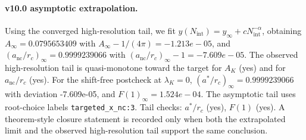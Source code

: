 \paragraph{v10.0 asymptotic extrapolation.}
Using the converged high-resolution tail, we fit $y(N_{\mathrm{int}})=y_{\infty}+cN_{\mathrm{int}}^{-\alpha}$, obtaining $A_\infty=0.0795653409$ with $A_\infty-1/(4\pi)=-1.213e-05$, and $(a_{\mathrm{nc}}/r_c)_\infty=0.9999239066$ with $(a_{\mathrm{nc}}/r_c)_\infty-1=-7.609e-05$. The observed high-resolution tail is quasi-monotone toward the target for $A_K$ (yes) and for $a_{\mathrm{nc}}/r_c$ (yes). For the shift-free postcheck at $\lambda_K=0$, $(a^*/r_c)_\infty=0.9999239066$ with deviation -7.609e-05, and $F(1)_\infty=1.524e-04$. The asymptotic tail uses root-choice labels \texttt{targeted_x_nc:3}. Tail checks: $a^*/r_c$ (yes), $F(1)$ (yes). A theorem-style closure statement is recorded only when both the extrapolated limit and the
observed high-resolution tail support the same conclusion.
